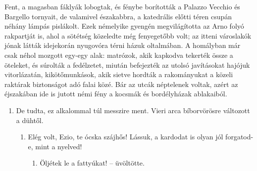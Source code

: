 \documentclass[12pt,a4paper]{article}
\begin{document}
Fent, a magasban fáklyák lobogtak, és fénybe borították a Palazzo Vecchio és Bargello tornyait, de valamivel északabbra, a katedrális előtti téren csupán néhány lámpás pislákolt. Ezek némelyike gyengén megvilágította az Arno folyó rakpartját is, ahol a sötétség közeledte még fenyegetőbb volt; az itteni városlakók jónak látták idejekorán nyugovóra  térni  házuk  oltalmában. A homályban  már  csak  néhol mozgott  egy-egy  alak:  matrózok,  akik  kapkodva  tekerték  össze  a öteleket,  és  súrolták  a  fedélzetet,  miután  befejezték  az  utolsó javításokat hajójuk vitorlázatán, kikötőmunkások, akik sietve hordták a rakományukat a közeli raktárak biztonságot adó falai közé. Bár az utcák néptelenek voltak, azért az éjszakában ide is jutott némi fény a kocsmák és bordélyházak ablakaiból.


\begin{enumerate}
    \item De  tudta, ez alkalommal túl messzire  ment. Vieri arca bíborvörösre változott a dühtől. 
    \begin{enumerate}
        \item Elég volt, Ezio, te ócska szájhős! Lássuk, a kardodat is olyan jól 
        forgatod-e, mint a nyelved!
        \begin{enumerate}
            \item Öljétek le a fattyúkat! – üvöltötte.
        \end{enumerate}
    \end{enumerate}
\end{enumerate}
\end{document}
